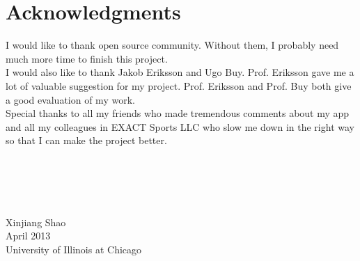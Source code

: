 \clearpage
{}
\chapter*{Acknowledgments}
\vspace{1.0in}

I would like to thank open source community. Without them, I probably need much more time to finish this project. \\

I would also like to thank Jakob Eriksson and Ugo Buy. Prof. Eriksson gave me a lot of valuable suggestion for my project. Prof. Eriksson and Prof. Buy both give a good evaluation of my work. \\

Special thanks to all my friends who made tremendous comments about my app and all my colleagues in EXACT Sports LLC who slow me down in the right way so that I can make the project better. \\

\leavevmode
\\
\\
\\
\\
\\
Xinjiang Shao \\
{April 2013}\\
{University of Illinois at Chicago}\\
\newpage
